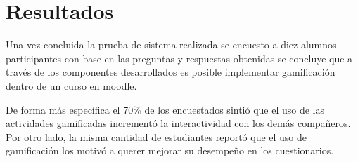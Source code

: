 
\section{Resultados}

    Una vez concluida la prueba de sistema realizada se encuesto a diez alumnos
    participantes con base en las preguntas y respuestas obtenidas se concluye que
    a través de los componentes desarrollados es posible implementar gamificación
    dentro de un curso en moodle.\par
    \noindent
    De forma más específica el 70\% de los encuestados sintió que el uso de las
    actividades gamificadas incrementó la interactividad con los demás compañeros.
    Por otro lado, la misma cantidad de estudiantes reportó que el uso de
    gamificación los motivó a querer mejorar su desempeño en los cuestionarios.
